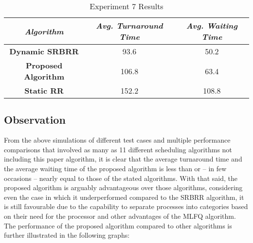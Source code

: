 \documentclass[conference]{IEEEtran}
\newcommand\T{\rule{0pt}{2.6ex}}       %
\newcommand\B{\rule[-1.2ex]{0pt}{0pt}} %
\begin{document}
\begin{table}[H]
    \caption{Experiment 7 Results}
    \centering
    \begin{tabular}{||c c c||}
        \hline
        \textit{\textbf{Algorithm}} & \textit{\textbf{Avg. Turnaround Time}} & \textit{\textbf{Avg. Waiting Time}}\T \B \\
    \hline
    \hline
    \textbf{Dynamic SRBRR} & 93.6 & 50.2 \T \B\\ \hline
    \textbf{Proposed Algorithm} & 106.8 & 63.4 \T \B\\ \hline
    \textbf{Static RR} & 152.2 & 108.8 \T \B\\ \hline
     \end{tabular}
\end{table}


\subsection{Observation}

From the above simulations of different test cases and multiple performance comparisons that involved as many as 11 different scheduling algorithms not including this paper algorithm, it is clear that the average turnaround time and the average waiting time of the proposed algorithm is less than or – in few occasions  – nearly equal to those of the stated algorithms. With that said, the proposed algorithm is arguably advantageous over those algorithms, considering even the case in which it underperformed compared to the SRBRR algorithm, it is still favourable due to the capability to separate processes into categories based on their need for the processor and other advantages of the MLFQ algorithm. The performance of the proposed algorithm compared to other algorithms is further illustrated in the following graphs:
\end{document}
